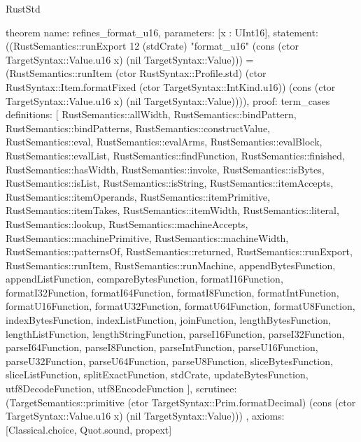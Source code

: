 \begin{lexlean}{RustStd}
\begin{semanticmodule}
theorem{
  name: refines_format_u16,
  parameters: [x : UInt16],
  statement: ((RustSemantics::runExport 12 (stdCrate) "format_u16" (cons (ctor TargetSyntax::Value.u16 x) (nil TargetSyntax::Value))) = (RustSemantics::runItem (ctor RustSyntax::Profile.std) (ctor RustSyntax::Item.formatFixed (ctor TargetSyntax::IntKind.u16)) (cons (ctor TargetSyntax::Value.u16 x) (nil TargetSyntax::Value)))),
  proof: term_cases{
    definitions: [
      RustSemantics::allWidth,
      RustSemantics::bindPattern,
      RustSemantics::bindPatterns,
      RustSemantics::constructValue,
      RustSemantics::eval,
      RustSemantics::evalArms,
      RustSemantics::evalBlock,
      RustSemantics::evalList,
      RustSemantics::findFunction,
      RustSemantics::finished,
      RustSemantics::hasWidth,
      RustSemantics::invoke,
      RustSemantics::isBytes,
      RustSemantics::isList,
      RustSemantics::isString,
      RustSemantics::itemAccepts,
      RustSemantics::itemOperands,
      RustSemantics::itemPrimitive,
      RustSemantics::itemTakes,
      RustSemantics::itemWidth,
      RustSemantics::literal,
      RustSemantics::lookup,
      RustSemantics::machineAccepts,
      RustSemantics::machinePrimitive,
      RustSemantics::machineWidth,
      RustSemantics::patternsOf,
      RustSemantics::returned,
      RustSemantics::runExport,
      RustSemantics::runItem,
      RustSemantics::runMachine,
      appendBytesFunction,
      appendListFunction,
      compareBytesFunction,
      formatI16Function,
      formatI32Function,
      formatI64Function,
      formatI8Function,
      formatIntFunction,
      formatU16Function,
      formatU32Function,
      formatU64Function,
      formatU8Function,
      indexBytesFunction,
      indexListFunction,
      joinFunction,
      lengthBytesFunction,
      lengthListFunction,
      lengthStringFunction,
      parseI16Function,
      parseI32Function,
      parseI64Function,
      parseI8Function,
      parseIntFunction,
      parseU16Function,
      parseU32Function,
      parseU64Function,
      parseU8Function,
      sliceBytesFunction,
      sliceListFunction,
      splitExactFunction,
      stdCrate,
      updateBytesFunction,
      utf8DecodeFunction,
      utf8EncodeFunction
    ],
    scrutinee: (TargetSemantics::primitive (ctor TargetSyntax::Prim.formatDecimal) (cons (ctor TargetSyntax::Value.u16 x) (nil TargetSyntax::Value)))
  },
  axioms: [Classical.choice, Quot.sound, propext]
}


\end{semanticmodule}
\end{lexlean}
